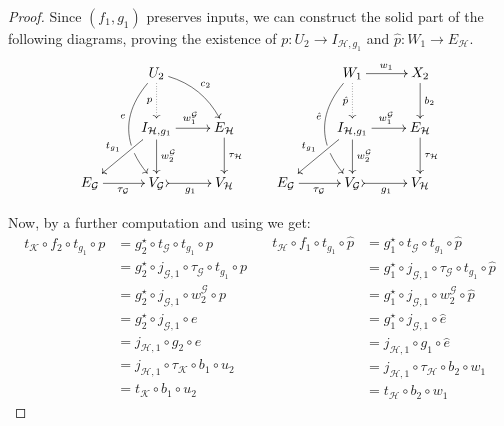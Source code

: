 \documentclass[runningheads,envcountsect]{llncs}
\begin{document}
\begin{proof}
Since $(f_1, g_1)$ preserves inputs, we can construct the solid part of the following diagrams, proving the existence of $p\colon U_2\to I_{\mathcal{H}, g_1}$ and $\hat{p}\colon W_1\to E_{\mathcal{H}}$.
\[\xymatrix{&U_2 \ar@{.>}[d]_{p} \ar@/_.7cm/[dd]_(.4){e}|(.69)\hole \ar@/^.3cm/[dr]^{c_2} & &&W_1 \ar@{.>}[d]_{\hat{p}} \ar@/_.7cm/[dd]_(.4){\hat{e}}|(.69)\hole \ar[r]^{w_1} & X_2 \ar[d]^{b_2}\\ &I_{\mathcal{H}, g_1} \ar@{>}[dl]_{t_{g_1}} \ar[r]^{w^{\mathcal{G}}_1} \ar[d]^{w^{\mathcal{G}}_2} & E_{\mathcal{H}} \ar[d]^{\tau_{\mathcal{H}}} & &I_{\mathcal{H}, g_1} \ar@{>}[dl]_{t_{g_1}} \ar[r]^{w^{\mathcal{G}}_1} \ar[d]^{w^{\mathcal{G}}_2} & E_{\mathcal{H}} \ar[d]^{\tau_{\mathcal{H}}}\\ E_{\mathcal{{G}}} \ar[r]_{\tau_{\mathcal{G}}}& V_{\mathcal{G}} \ar@{>->}[r]_{g_1}  & V_{\mathcal{{H}}} & E_{\mathcal{{G}}} \ar[r]_{\tau_{\mathcal{G}}}& V_{\mathcal{G}} \ar@{>->}[r]_{g_1}  & V_{\mathcal{{H}}}}\]



Now, by a further computation and using  we get:
\[
\begin{split}
	t_{\mathcal{K}}\circ f_2\circ t_{g_1}\circ p&=g^\star_2\circ t_{\mathcal{G}}\circ t_{g_1}\circ p\\&=g^{\star}_2\circ j_{\mathcal{G}, 1}\circ \tau_{\mathcal{G}} \circ t_{g_1}\circ p\\&=g^{\star}_2\circ j_{\mathcal{G}, 1}\circ w^{\mathcal{G}}_2\circ p\\&=g^{\star}_2\circ j_{\mathcal{G}, 1}\circ e\\&=j_{\mathcal{H},1}\circ g_2\circ e\\&=j_{\mathcal{H},1}\circ \tau_{\mathcal{K}}\circ b_1\circ u_2\\&=t_{\mathcal{K}}\circ b_1\circ u_2
\end{split} \quad \begin{split}
	t_{\mathcal{H}}\circ f_1\circ t_{g_1}\circ \hat{p}&=g^\star_1\circ t_{\mathcal{G}}\circ t_{g_1}\circ \hat{p}\\&=g^{\star}_1\circ j_{\mathcal{G}, 1}\circ \tau_{\mathcal{G}} \circ t_{g_1}\circ \hat{p}\\&=g^{\star}_1\circ j_{\mathcal{G}, 1}\circ w^{\mathcal{G}}_2\circ \hat{p}\\&=g^{\star}_1\circ j_{\mathcal{G}, 1}\circ \hat{e}\\&=j_{\mathcal{H},1}\circ g_1\circ \hat{e}\\&=j_{\mathcal{H},1}\circ \tau_{\mathcal{H}}\circ b_2\circ w_1\\&=t_{\mathcal{H}}\circ b_2\circ w_1
\end{split}\]


\end{proof}
\end{document}
